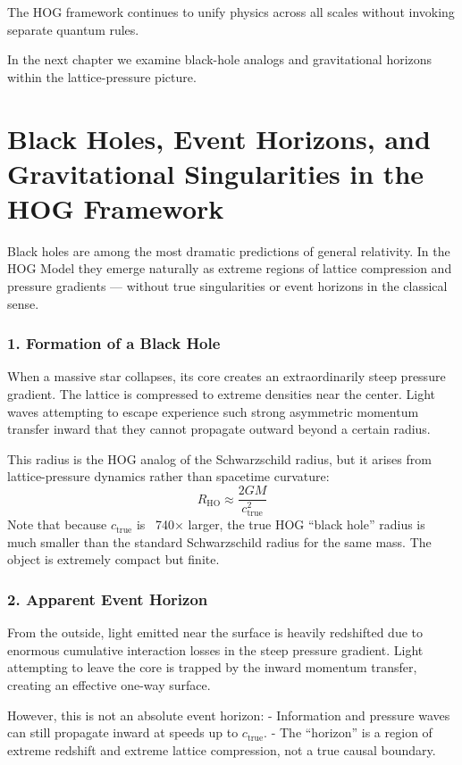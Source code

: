 \documentclass[11pt,a4paper]{book}
\begin{document}
{The HOG framework continues to unify physics across all scales without invoking separate quantum rules.

In the next chapter we examine black-hole analogs and gravitational horizons within the lattice-pressure picture.

\chapter{Black Holes, Event Horizons, and Gravitational Singularities in the HOG Framework}

Black holes are among the most dramatic predictions of general relativity. In the HOG Model they emerge naturally as extreme regions of lattice compression and pressure gradients — without true singularities or event horizons in the classical sense.

\subsection{1. Formation of a Black Hole}
When a massive star collapses, its core creates an extraordinarily steep pressure gradient. The lattice is compressed to extreme densities near the center. Light waves attempting to escape experience such strong asymmetric momentum transfer inward that they cannot propagate outward beyond a certain radius.

This radius is the HOG analog of the Schwarzschild radius, but it arises from lattice-pressure dynamics rather than spacetime curvature:
\[
R_{\text{HO}} \approx \frac{2 G M}{c_{\text{true}}^2}
\]
Note that because \( c_{\text{true}} \) is ~740× larger, the true HOG “black hole” radius is much smaller than the standard Schwarzschild radius for the same mass. The object is extremely compact but finite.

\subsection{2. Apparent Event Horizon}
From the outside, light emitted near the surface is heavily redshifted due to enormous cumulative interaction losses in the steep pressure gradient. Light attempting to leave the core is trapped by the inward momentum transfer, creating an effective one-way surface.

However, this is not an absolute event horizon:
- Information and pressure waves can still propagate inward at speeds up to \( c_{\text{true}} \).
- The “horizon” is a region of extreme redshift and extreme lattice compression, not a true causal boundary.

}
\end{document}

